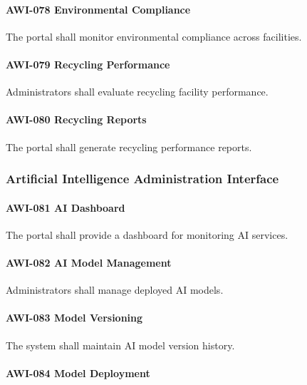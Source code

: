 \paragraph{AWI-078 Environmental Compliance}

The portal shall monitor environmental compliance across facilities.

\paragraph{AWI-079 Recycling Performance}

Administrators shall evaluate recycling facility performance.

\paragraph{AWI-080 Recycling Reports}

The portal shall generate recycling performance reports.


\subsubsection*{Artificial Intelligence Administration Interface}

\paragraph{AWI-081 AI Dashboard}

The portal shall provide a dashboard for monitoring AI services.

\paragraph{AWI-082 AI Model Management}

Administrators shall manage deployed AI models.

\paragraph{AWI-083 Model Versioning}

The system shall maintain AI model version history.

\paragraph{AWI-084 Model Deployment}

